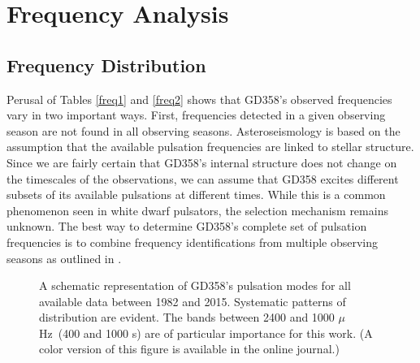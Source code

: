 \documentclass[12pt,preprint]{aastex}
\newcommand{\muHz}{\mbox{$\mu$Hz}}
\begin{document}
\section{Frequency Analysis}\label{analysis}

\subsection{Frequency Distribution}
Perusal of Tables \ref{freq1} and \ref{freq2} shows that GD358's observed frequencies vary in two
important ways.  First, frequencies detected in a given observing season are not found 
in all observing seasons. Asteroseismology is based on the assumption that the available pulsation
frequencies are linked to stellar structure.  Since we are fairly certain that GD358's internal structure 
does not change on the timescales of the observations, we can assume that GD358 excites 
different subsets of its available pulsations at different times. While this is a common phenomenon
seen in white dwarf pulsators, the selection mechanism remains unknown. The best way to 
determine GD358's complete set of pulsation frequencies is to combine frequency identifications 
from multiple observing seasons as outlined in \citet{Kleinman98}.  

\begin{figure}
\caption{A schematic representation of GD358's pulsation modes for all available data between
1982 and 2015. Systematic patterns of distribution are evident. The bands between 2400 and 1000
\muHz\ (400 and 1000 s) are of particular importance for this work. (A color version of this 
figure is available in the online journal.)
\label{schematic}
}
\end{figure}
\end{document}
